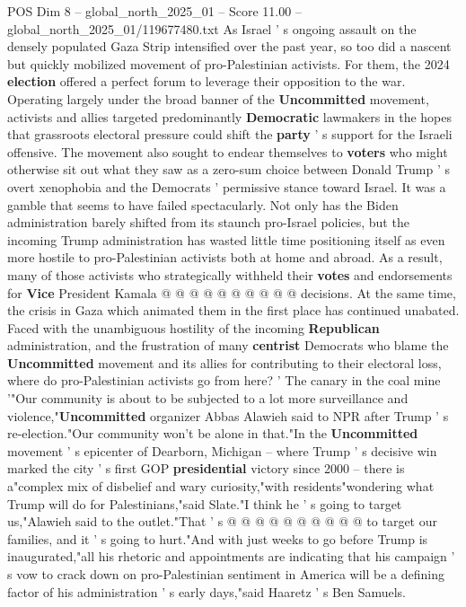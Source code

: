 \begin{textsample}{POS Dim 8 – global\_north\_2025\_01 – Score 11.00 – global\_north\_2025\_01/119677480.txt}  \label{ex:f8_pos_291}
As Israel ' s ongoing assault on the densely populated Gaza Strip intensified over the past year, so too did a nascent but quickly mobilized movement of pro-Palestinian activists.
For them, the 2024 \textbf{election} offered a perfect forum to leverage their opposition to the war.
Operating largely under the broad banner of the \textbf{Uncommitted} movement, activists and allies targeted predominantly \textbf{Democratic} lawmakers in the hopes that grassroots electoral pressure could shift the \textbf{party} ' s support for the Israeli offensive.
The movement also sought to endear themselves to \textbf{voters} who might otherwise sit out what they saw as a zero-sum choice between Donald Trump ' s overt xenophobia and the Democrats ' permissive stance toward Israel.
It was a gamble that seems to have failed spectacularly.
Not only has the Biden administration barely shifted from its staunch pro-Israel policies, but the incoming Trump administration has wasted little time positioning itself as even more hostile to pro-Palestinian activists both at home and abroad.
As a result, many of those activists who strategically withheld their \textbf{votes} and endorsements for \textbf{Vice} President Kamala @ @ @ @ @ @ @ @ @ @ decisions.
At the same time, the crisis in Gaza which animated them in the first place has continued unabated.
Faced with the unambiguous hostility of the incoming \textbf{Republican} administration, and the frustration of many \textbf{centrist} Democrats who blame the \textbf{Uncommitted} movement and its allies for contributing to their electoral loss, where do pro-Palestinian activists go from here? ' The canary in the coal mine '"Our community is about to be subjected to a lot more surveillance and violence,"\textbf{Uncommitted} organizer Abbas Alawieh said to NPR after Trump ' s re-election."Our community won't be alone in that."In the \textbf{Uncommitted} movement ' s epicenter of Dearborn, Michigan -- where Trump ' s decisive win marked the city ' s first GOP \textbf{presidential} victory since 2000 -- there is a"complex mix of disbelief and wary curiosity,"with residents"wondering what Trump will do for Palestinians,"said Slate."I think he ' s going to target us,"Alawieh said to the outlet."That ' s @ @ @ @ @ @ @ @ @ @ to target our families, and it ' s going to hurt."And with just weeks to go before Trump is inaugurated,"all his rhetoric and appointments are indicating that his campaign ' s vow to crack down on pro-Palestinian sentiment in America will be a defining factor of his administration ' s early days,"said Haaretz ' s Ben Samuels.

\end{textsample}
